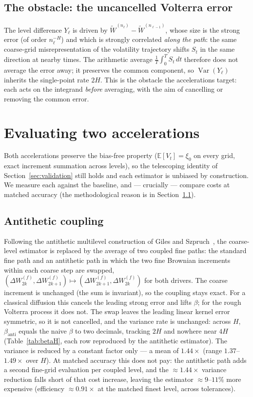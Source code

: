 \documentclass[11pt]{article}
\begin{document}
\subsection{The obstacle: the uncancelled Volterra error}
\label{sec:mechanism}
The level difference $Y_\ell$ is driven by
$\widetilde{W}^{(n_\ell)}-\widetilde{W}^{(n_{\ell-1})}$, whose size is the strong error (of
order $n_\ell^{-H}$) and which is strongly correlated \emph{along the path}: the same
coarse-grid misrepresentation of the volatility trajectory shifts $S_t$ in the same
direction at nearby times. The arithmetic average $\tfrac1T\int_0^T S_t\,dt$ therefore does
not average the error away; it preserves the common component, so
$\operatorname{Var}(Y_\ell)$ inherits the single-point rate $2H$. This is the obstacle the
accelerations target: each acts on the integrand \emph{before} averaging, with the aim of
cancelling or removing the common error.

\section{Evaluating two accelerations}
\label{sec:couplings}

Both accelerations preserve the bias-free property ($\mathbb{E}[V_t]=\xi_0$ on every grid,
exact increment summation across levels), so the telescoping identity of
Section~\ref{sec:validation} still holds and each estimator is unbiased by construction. We
measure each against the baseline, and --- crucially --- compare costs at matched accuracy
(the methodological reason is in Section~\ref{sec:antithetic}).

\subsection{Antithetic coupling}
\label{sec:antithetic}
Following the antithetic multilevel construction of Giles and
Szpruch~\cite{gilesszpruch2014}, the coarse-level estimator is replaced by the average of
two coupled fine paths: the standard fine path and an antithetic path in which the two fine
Brownian increments within each coarse step are swapped,
$(\Delta W^{(f)}_{2k},\Delta W^{(f)}_{2k+1})\mapsto(\Delta W^{(f)}_{2k+1},\Delta
W^{(f)}_{2k})$ for both drivers. The coarse increment is unchanged (the sum is invariant),
so the coupling stays exact. For a classical diffusion this cancels the leading strong
error and lifts $\beta$; for the rough Volterra process it does not. The swap leaves the
leading linear kernel error symmetric, so it is not cancelled, and the variance rate is
unchanged: across $H$, $\beta_{\text{anti}}$ equals the naive $\beta$ to two decimals,
tracking $2H$ and nowhere near $4H$ (Table~\ref{tab:betaH}, each row reproduced by the
antithetic estimator). The variance is reduced by a constant factor only --- a mean of
$1.44\times$ (range $1.37$--$1.49\times$ over $H$). At matched accuracy this does not pay:
the antithetic path adds a second fine-grid evaluation per coupled level, and the
$\approx1.44\times$ variance reduction falls short of that cost increase, leaving the
estimator $\approx9$--$11\%$ more expensive (efficiency $\approx0.91\times$ at the matched
finest level, across tolerances).
\end{document}

